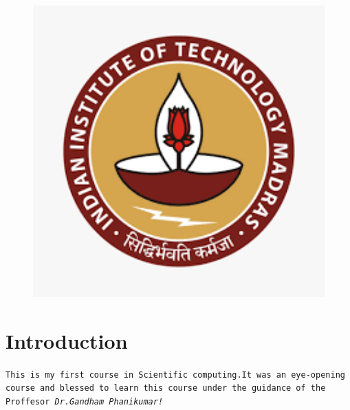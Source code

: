 \documentclass[a4paper, 12pt]{article}
\begin{document}
\begin{figure}[h]
\centering
\includegraphics[width=1\textwidth]{iitm.png}
\caption{\textit{\color{red}{Indian Institute of Technology, Madras}}}
\label{image-IIT Madras}
\end{figure}

 \title{}

\author{Dhaval Raghwani \\ BE19B027}

\date{\today}
\maketitle

{\color{blue}\tableofcontents}

\listoffigures

\listoftables

\section{Introduction}
\texttt{This is my first course in Scientific computing.It was an eye-opening course and blessed to learn this course under the guidance of the Proffesor {\color{blue}\textit{Dr.Gandham Phanikumar!}}}
\end{document}
